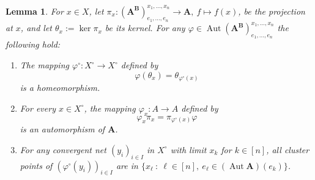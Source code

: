\documentclass[12pt,a4paper,reqno]{amsart}
\numberwithin{equation}{section}
\theoremstyle{plain}
\newtheorem{lem}[thm]{Lemma}
\theoremstyle{definition}
\newcommand{\A}{\mathbf{A}}
\newcommand{\ABxe}{(\mathbf{A^B})^{x_1,\dots,x_n}_{e_1,\dots,e_n}}
\DeclareMathOperator{\Aut}{Aut}
\newcommand{\st}{\: :\:}
\begin{document}
\begin{lem} \label{lem:hphi}
 For $x\in X$, let $\pi_x\colon \ABxe\to \A,\ f\mapsto f(x)$, be the projection at $x$,
 and let $\theta_x:=\ker\pi_x$ be its kernel. For any $\varphi\in\Aut\ABxe$ the following hold:
\begin{enumerate}
\item \label{it:phicirc1}
 The mapping $\varphi^{\circ}\colon X^\circ\to X^\circ$ defined by
\[ \varphi(\theta_x) = \theta_{\varphi^\circ(x)} \]
 is a homeomorphism.
\item \label{it:phix}
 For every $x\in X^\circ$, the mapping $\varphi_x\colon A\rightarrow A$ defined by
\begin{equation}
\label{eq:phixdef}
\varphi_x \pi_x = \pi_{\varphi^\circ(x)} \varphi
\end{equation}
is an automorphism of $\A$.
\item \label{it:phicirc2}
 For any convergent net $(y_i)_{i\in I}$ in $X^\circ$ with limit $x_k$ for $k\in[n]$, all cluster points of
 $(\varphi^\circ(y_i))_{i\in I}$ are in $\{x_\ell \st \ell\in [n],\ e_\ell\in(\Aut\A)(e_k)\}$.
\end{enumerate}  
\end{lem}
\end{document}
